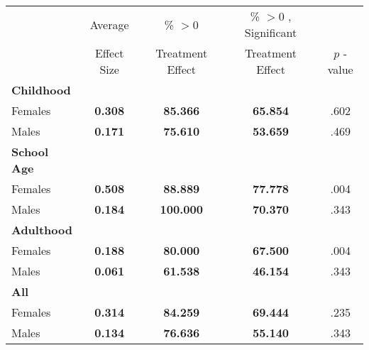 \begin{tabular}{l c c c c}
\toprule
 & Average & \% $ >0 $ & \% $ >0 $ , Significant & \citet{Rosenbaum_2005_Distribution_JRSS} \\
 & Effect Size & Treatment Effect & Treatment Effect & $ p $ -value \\
\midrule
\textbf{Childhood} & & & & \\
\quad Females &  \textbf{    0.308} & \textbf{   85.366} & \textbf{   65.854} & .602 \\
\quad Males &  \textbf{    0.171} & \textbf{   75.610} & \textbf{   53.659} & .469 \\
\midrule
\textbf{School Age} & & & & \\
\quad Females &  \textbf{    0.508} & \textbf{   88.889} & \textbf{   77.778} & .004 \\
\quad Males &  \textbf{    0.184} & \textbf{  100.000} & \textbf{   70.370} & .343 \\
\midrule
\textbf{Adulthood} & & & & \\
\quad Females &  \textbf{    0.188} & \textbf{   80.000} & \textbf{   67.500} & .004 \\
\quad Males &  \textbf{    0.061} & \textbf{   61.538} & \textbf{   46.154} & .343 \\
\midrule
\textbf{All} & & & & \\
\quad Females &  \textbf{    0.314} & \textbf{   84.259} & \textbf{   69.444} & .235 \\
\quad Males &  \textbf{    0.134} & \textbf{   76.636} & \textbf{   55.140} & .343 \\
\bottomrule
\end{tabular}
